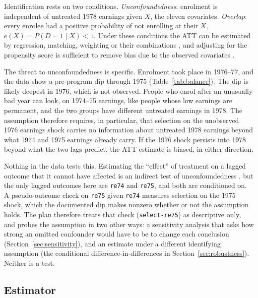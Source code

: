 \documentclass[11pt]{article}
\newcommand{\var}[1]{\texttt{#1}}
\begin{document}
Identification rests on two conditions. \emph{Unconfoundedness}: enrolment is independent of
untreated 1978 earnings given $X$, the eleven covariates. \emph{Overlap}: every enrolee had a
positive probability of not enrolling at their $X$, $e(X) = P(D = 1 \mid X) < 1$. Under
these conditions the ATT can be estimated by regression, matching, weighting or their
combinations \citep{imbens2004,imbens2009}, and adjusting for the propensity score is
sufficient to remove bias due to the observed covariates \citep{rosenbaum1983}.

The threat to unconfoundedness is specific. Enrolment took place in 1976--77, and the data
show a pre-program dip through 1975 (Table~\ref{tab:balance}). The dip is likely deepest in
1976, which is not observed. People who enrol after an unusually bad year can look, on
1974--75 earnings, like people whose low earnings are permanent, and the two groups have
different untreated earnings in 1978. The assumption therefore requires, in particular, that
selection on the unobserved 1976 earnings shock carries no information about untreated 1978
earnings beyond what 1974 and 1975 earnings already carry. If the 1976 shock persists into
1978 beyond what the two lags predict, the ATT estimate is biased, in either direction.

Nothing in the data tests this. Estimating the ``effect'' of treatment on a lagged outcome
that it cannot have affected is an indirect test of unconfoundedness \citep{imbens2004}, but
the only lagged outcomes here are \var{re74} and \var{re75}, and both are conditioned on. A
pseudo-outcome check on \var{re75} given \var{re74} measures selection on the 1975 shock,
which the documented dip makes nonzero whether or not the assumption holds. The plan
therefore treats that check (\texttt{select-re75}) as descriptive only, and probes the
assumption in two other ways: a sensitivity analysis that asks how strong an omitted
confounder would have to be to change each conclusion (Section~\ref{sec:sensitivity}), and an
estimate under a different identifying assumption (the conditional difference-in-differences
in Section~\ref{sec:robustness}). Neither is a test.

\subsection{Estimator}
\end{document}
